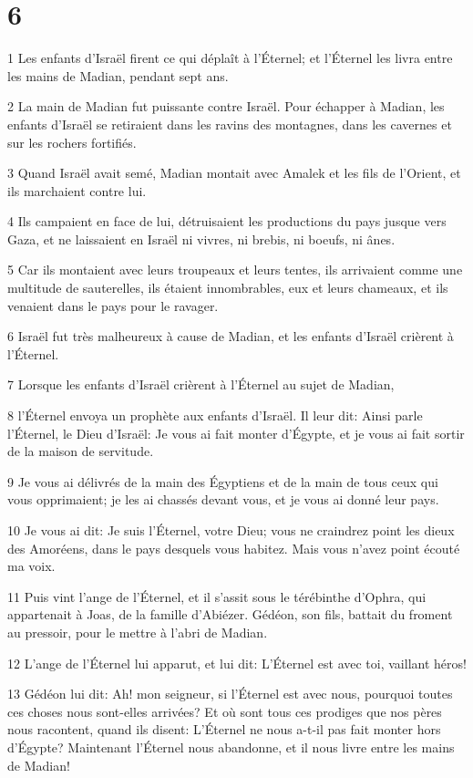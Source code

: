 \chapter{6}

\par 1 Les enfants d'Israël firent ce qui déplaît à l'Éternel; et l'Éternel les livra entre les mains de Madian, pendant sept ans.
\par 2 La main de Madian fut puissante contre Israël. Pour échapper à Madian, les enfants d'Israël se retiraient dans les ravins des montagnes, dans les cavernes et sur les rochers fortifiés.
\par 3 Quand Israël avait semé, Madian montait avec Amalek et les fils de l'Orient, et ils marchaient contre lui.
\par 4 Ils campaient en face de lui, détruisaient les productions du pays jusque vers Gaza, et ne laissaient en Israël ni vivres, ni brebis, ni boeufs, ni ânes.
\par 5 Car ils montaient avec leurs troupeaux et leurs tentes, ils arrivaient comme une multitude de sauterelles, ils étaient innombrables, eux et leurs chameaux, et ils venaient dans le pays pour le ravager.
\par 6 Israël fut très malheureux à cause de Madian, et les enfants d'Israël crièrent à l'Éternel.
\par 7 Lorsque les enfants d'Israël crièrent à l'Éternel au sujet de Madian,
\par 8 l'Éternel envoya un prophète aux enfants d'Israël. Il leur dit: Ainsi parle l'Éternel, le Dieu d'Israël: Je vous ai fait monter d'Égypte, et je vous ai fait sortir de la maison de servitude.
\par 9 Je vous ai délivrés de la main des Égyptiens et de la main de tous ceux qui vous opprimaient; je les ai chassés devant vous, et je vous ai donné leur pays.
\par 10 Je vous ai dit: Je suis l'Éternel, votre Dieu; vous ne craindrez point les dieux des Amoréens, dans le pays desquels vous habitez. Mais vous n'avez point écouté ma voix.
\par 11 Puis vint l'ange de l'Éternel, et il s'assit sous le térébinthe d'Ophra, qui appartenait à Joas, de la famille d'Abiézer. Gédéon, son fils, battait du froment au pressoir, pour le mettre à l'abri de Madian.
\par 12 L'ange de l'Éternel lui apparut, et lui dit: L'Éternel est avec toi, vaillant héros!
\par 13 Gédéon lui dit: Ah! mon seigneur, si l'Éternel est avec nous, pourquoi toutes ces choses nous sont-elles arrivées? Et où sont tous ces prodiges que nos pères nous racontent, quand ils disent: L'Éternel ne nous a-t-il pas fait monter hors d'Égypte? Maintenant l'Éternel nous abandonne, et il nous livre entre les mains de Madian!
